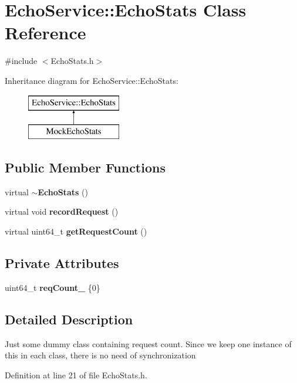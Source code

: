\section{Echo\+Service\+:\+:Echo\+Stats Class Reference}
\label{classEchoService_1_1EchoStats}


{\ttfamily \#include $<$Echo\+Stats.\+h$>$}

Inheritance diagram for Echo\+Service\+:\+:Echo\+Stats\+:\begin{figure}[H]
\begin{center}
\leavevmode
\includegraphics[height=2.000000cm]{classEchoService_1_1EchoStats}
\end{center}
\end{figure}
\subsection*{Public Member Functions}
\begin{DoxyCompactItemize}
\item 
virtual {\bf $\sim$\+Echo\+Stats} ()
\item 
virtual void {\bf record\+Request} ()
\item 
virtual uint64\+\_\+t {\bf get\+Request\+Count} ()
\end{DoxyCompactItemize}
\subsection*{Private Attributes}
\begin{DoxyCompactItemize}
\item 
uint64\+\_\+t {\bf req\+Count\+\_\+} \{0\}
\end{DoxyCompactItemize}


\subsection{Detailed Description}
Just some dummy class containing request count. Since we keep one instance of this in each class, there is no need of synchronization 

Definition at line 21 of file Echo\+Stats.\+h.



